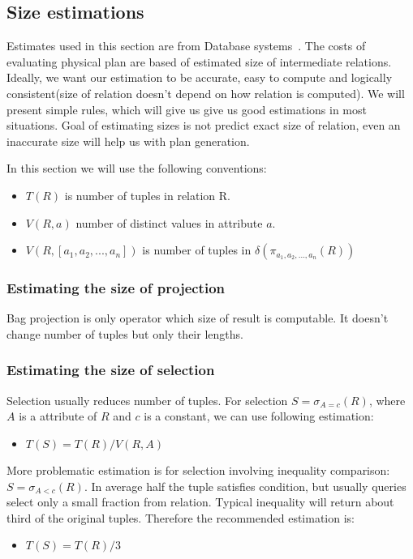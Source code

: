 \subsection{Size estimations}
Estimates used in this section are from Database systems~\cite{database}. 
The costs of evaluating physical plan are based of estimated size of interme\-dia\-te relations. Ideally, we want our estimation to be accurate, easy to compute and logically consistent(size of relation doesn't depend on how relation is computed). We will present simple rules, which will give us give us good estimations in most situations. Goal of estimating sizes is not predict exact size of relation, even an inaccurate size will help us with plan generation.

In this section we will use the following conventions:

\begin{itemize}
\item $T(R)$ is number of tuples in relation R.
\item $V(R,a)$ number of distinct values in attribute $a$. 
\item $V(R,[a_1,a_2,...,a_n])$ is number of tuples in $\delta(\pi_{a_1,a_2,...,a_n}(R))$
\end{itemize}

\subsubsection{Estimating the size of projection}

Bag projection is only operator which size of result is computable. It doesn't change number of tuples but only their lengths.

\subsubsection{Estimating the size of selection}

Selection usually reduces number of tuples. For selection $S=\sigma_{A=c}(R)$, where $A$ is a attribute of $R$ and $c$ is a constant, we can use following estimation:
\begin{itemize}
\item $T(S)=T(R)/V(R,A)$
\end{itemize}

More problematic estimation is for selection involving inequality comparison:  $S=\sigma_{A<c}(R)$. In average half the tuple satisfies condition, but usually queries select only a small fraction from relation. Typical inequality will return about third of the original tuples. Therefore the recommended estimation is:
\begin{itemize}
\item $T(S)=T(R)/3$
\end{itemize}

